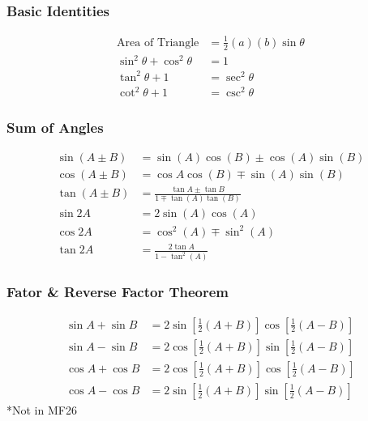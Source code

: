 \documentclass[../main.tex]{subfiles}
\begin{document}
\newpage

\subsubsection{Basic Identities}
\begin{align*}
    \displaystyle \text{Area of Triangle} &= \frac{1}{2}(a)(b)\sin{\theta} \\
    \displaystyle \sin^{2}{\theta}+\cos^{2}{\theta} &= 1 \\
    \displaystyle \tan^{2}{\theta}+1 &= \sec^{2}{\theta} \\
    \displaystyle \cot^{2}{\theta}+1 &= \csc^{2}{\theta}
\end{align*}

\subsubsection{Sum of Angles}
\begin{align*}
    \displaystyle \sin{(A \pm B)} &= \sin{(A)}\cos{(B)} \pm \cos{(A)}\sin{(B)} \\
    \displaystyle \cos{(A \pm B)} &= \cos{{A}}\cos{(B)} \mp \sin{(A)}\sin{(B)} \\
    \displaystyle \tan{(A \pm B)} &= \frac{\tan{A} \pm \tan{B}}{1 \mp \tan{(A)}\tan{(B)}} \\
    \displaystyle \sin{2A} &= 2\sin{(A)}\cos{(A)} \\
    \displaystyle \cos{2A} &= \cos^{2}{{(A)}} \mp \sin^{2}{(A)} \\
    \displaystyle \tan{2A} &= \frac{2\tan{A}}{1-\tan^{2}{(A)}}
\end{align*}

\subsubsection{Fator \& Reverse Factor Theorem}
    \begin{align*}
        \displaystyle \sin{A}+\sin{B} &= 2\sin{\left[\frac{1}{2}(A+B)\right]}\cos{\left[\frac{1}{2}(A-B)\right]} \\
        \displaystyle \sin{A}-\sin{B} &= 2\cos{\left[\frac{1}{2}(A+B)\right]}\sin{\left[\frac{1}{2}(A-B)\right]} \\
        \displaystyle \cos{A}+\cos{B} &= 2\cos{\left[\frac{1}{2}(A+B)\right]}\cos{\left[\frac{1}{2}(A-B)\right]} \\
        \displaystyle \cos{A}-\cos{B} &= 2\sin{\left[\frac{1}{2}(A+B)\right]}\sin{\left[\frac{1}{2}(A-B)\right]}
    \end{align*}
*Not in MF26
\end{document}
